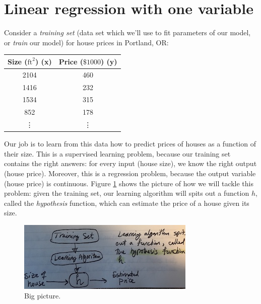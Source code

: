 \documentclass{article}
\theoremstyle{definition}
\begin{document}
\section{Linear regression with one variable}
Consider a \textit{training set} (data set which we'll use to fit parameters of our model, or \textit{train} our model) for house prices in Portland, OR:

\begin{center}
\begin{tabular}{ |c|c| } 
 \hline
 Size ($\text{ft}^2$) (x) & Price ($\$1000$) (y) \\
 \hline
 2104 & 460 \\
 1416 & 232 \\
 1534 & 315 \\
 852 & 178 \\
 \vdots & \vdots \\
 \hline
\end{tabular}
\end{center}

Our job is to learn from this data how to predict prices of houses as a function of their size. This is a supervised learning problem, because our training set contains the right answers: for every input (house size), we know the right output (house price). Moreover, this is a regression problem, because the output variable (house price) is continuous. Figure \ref{linreg-bigpic} shows the picture of how we will tackle this problem: given the training set, our learning algorithm will spits out a function $h$, called the \textit{hypothesis} function, which can estimate the price of a house given its size.

\begin{figure}[ht]
\centering
\includegraphics[scale=0.8]{images/lin_reg/big-picture.jpg}
\caption{Big picture.}
\label{linreg-bigpic}
\end{figure}

\end{document}
